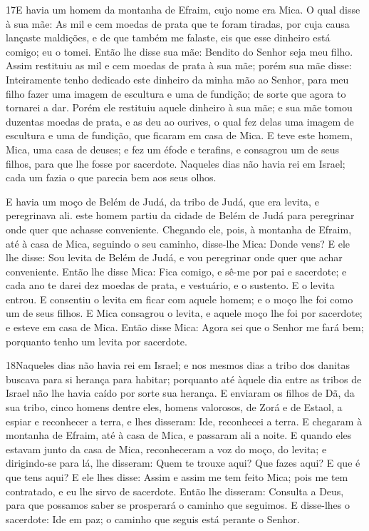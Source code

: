 \medskip

\lettrine{17} E havia um homem da montanha de Efraim, cujo
nome era Mica. O qual disse à sua mãe: As mil e cem moedas de
prata que te foram tiradas, por cuja causa lançaste maldições, e de
que também me falaste, eis que esse dinheiro está comigo; eu o
tomei. Então lhe disse sua mãe: Bendito do Senhor seja meu filho.
Assim restituiu as mil e cem moedas de prata à sua mãe; porém
sua mãe disse: Inteiramente tenho dedicado este dinheiro da minha
mão ao Senhor, para meu filho fazer uma imagem de escultura e uma de
fundição; de sorte que agora to tornarei a dar. Porém ele
restituiu aquele dinheiro à sua mãe; e sua mãe tomou duzentas moedas
de prata, e as deu ao ourives, o qual fez delas uma imagem de
escultura e uma de fundição, que ficaram em casa de Mica. E teve
este homem, Mica, uma casa de deuses; e fez um éfode e terafins, e
consagrou um de seus filhos, para que lhe fosse por sacerdote.
Naqueles dias não havia rei em Israel; cada um fazia o que
parecia bem aos seus olhos.

E havia um moço de Belém de Judá, da tribo de Judá, que era
levita, e peregrinava ali. este homem partiu da cidade de
Belém de Judá para peregrinar onde quer que achasse conveniente.
Chegando ele, pois, à montanha de Efraim, até à casa de Mica,
seguindo o seu caminho, disse-lhe Mica: Donde vens? E ele lhe
disse: Sou levita de Belém de Judá, e vou peregrinar onde quer que
achar conveniente. Então lhe disse Mica: Fica comigo, e sê-me
por pai e sacerdote; e cada ano te darei dez moedas de prata, e
vestuário, e o sustento. E o levita entrou. E consentiu o
levita em ficar com aquele homem; e o moço lhe foi como um de seus
filhos. E Mica consagrou o levita, e aquele moço lhe foi por
sacerdote; e esteve em casa de Mica. Então disse Mica: Agora
sei que o Senhor me fará bem; porquanto tenho um levita por
sacerdote.

\medskip

\lettrine{18} Naqueles dias não havia rei em Israel; e nos
mesmos dias a tribo dos danitas buscava para si herança para
habitar; porquanto até àquele dia entre as tribos de Israel não lhe
havia caído por sorte sua herança. E enviaram os filhos de Dã,
da sua tribo, cinco homens dentre eles, homens valorosos, de Zorá e
de Estaol, a espiar e reconhecer a terra, e lhes disseram: Ide,
reconhecei a terra. E chegaram à montanha de Efraim, até à casa de
Mica, e passaram ali a noite. E quando eles estavam junto da
casa de Mica, reconheceram a voz do moço, do levita; e dirigindo-se
para lá, lhe disseram: Quem te trouxe aqui? Que fazes aqui? E que é
que tens aqui? E ele lhes disse: Assim e assim me tem feito
Mica; pois me tem contratado, e eu lhe sirvo de sacerdote. Então
lhe disseram: Consulta a Deus, para que possamos saber se prosperará
o caminho que seguimos. E disse-lhes o sacerdote: Ide em paz; o
caminho que seguis está perante o Senhor.

